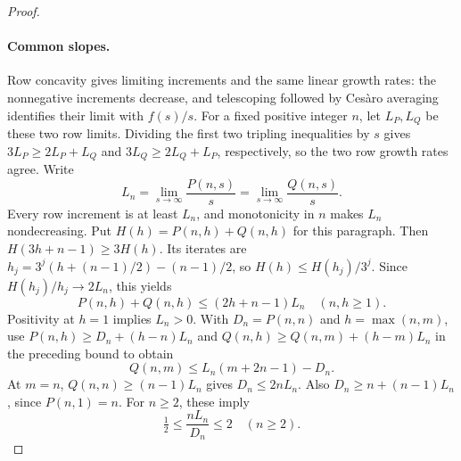 \documentclass[11pt]{article}
\theoremstyle{remark}
\begin{document}
\begin{proof}
\paragraph{Common slopes.}
Row concavity gives limiting increments and the same linear growth
rates: the nonnegative increments decrease, and telescoping followed
by Ces\`aro averaging identifies their limit with $f(s)/s$.
For a fixed positive integer $n$, let $L_P,L_Q$ be these two row limits.
Dividing the first two tripling inequalities by $s$ gives
$3L_P\geq2L_P+L_Q$ and $3L_Q\geq2L_Q+L_P$, respectively,
so the two row growth rates agree. Write
\[
 L_n=\lim_{s\to\infty}\frac{P(n,s)}s
    =\lim_{s\to\infty}\frac{Q(n,s)}s.
\]
Every row increment is at least $L_n$, and monotonicity in $n$ makes
$L_n$ nondecreasing. Put $H(h)=P(n,h)+Q(n,h)$ for this paragraph.
Then $H(3h+n-1)\geq3H(h)$. Its iterates are
$h_j=3^j(h+(n-1)/2)-(n-1)/2$, so
$H(h)\leq H(h_j)/3^j$. Since $H(h_j)/h_j\to2L_n$, this yields
\[
 P(n,h)+Q(n,h)\leq(2h+n-1)L_n\quad(n,h\geq1).
\]
Positivity at $h=1$ implies $L_n>0$. With $D_n=P(n,n)$ and
$h=\max(n,m)$, use
$P(n,h)\geq D_n+(h-n)L_n$ and
$Q(n,h)\geq Q(n,m)+(h-m)L_n$ in the preceding bound to obtain
\[
 Q(n,m)\leq L_n(m+2n-1)-D_n.
\]
At $m=n$, $Q(n,n)\geq(n-1)L_n$ gives $D_n\leq2nL_n$.
Also $D_n\geq n+(n-1)L_n$, since $P(n,1)=n$. For $n\geq2$,
these imply
\[
 \tfrac12\leq\frac{nL_n}{D_n}\leq2\quad(n\geq2).
\]


\end{proof}
\end{document}

